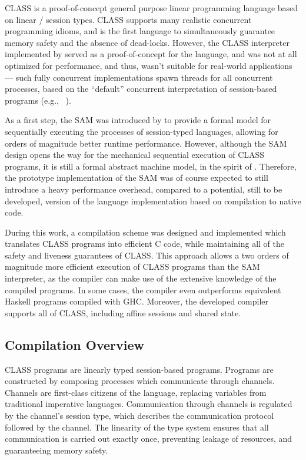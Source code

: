 \documentclass[sigconf,nonacm,natbib=true]{acmart}
\begin{document}
\acs{CLASS} \citep{Rocha:2021, Rocha:2023, Rocha:2022} is a proof-of-concept general purpose linear programming language based on linear / session types.
\acs{CLASS} supports many realistic concurrent programming idioms, and is the first language to simultaneously guarantee memory safety and the absence of dead-locks.
%
However, the \acs{CLASS} interpreter implemented by \citet{Rocha:2021:artifact,Rocha:2023:artifact} served as a proof-of-concept for the language, and was not at all optimized for performance, and thus, wasn't suitable for real-world applications --- such fully concurrent implementations spawn threads for all concurrent processes, based on the ``default'' concurrent interpretation of session-based programs (e.g., ~\citep{FreeST:2019,Jespersen:2015}).
%

%
As a first step, the \acf{SAM}  was introduced by \citet{Caires:2024} to provide a formal model for sequentially executing the processes of session-typed languages, allowing for orders of magnitude better runtime performance.
However, although the \ac{SAM} design opens the way for the mechanical sequential execution of CLASS programs, it is still a formal abstract machine model, in the spirit of \citep{Landin:1964,Lafont:1988}. Therefore, the prototype implementation of the SAM \citep{Caires:2024:artifact} was of course expected to still introduce a heavy performance overhead, compared to a potential, still to be developed, version of the language implementation based on compilation to native code.

During this work, a compilation scheme was designed and implemented which translates \acs{CLASS} programs into efficient C code, while maintaining all of the safety and liveness guarantees of \acs{CLASS}. This approach allows a two orders of magnitude more efficient execution of \acs{CLASS} programs than the \ac{SAM} interpreter, as the compiler can make use of the extensive knowledge of the compiled programs. In some cases, the compiler even outperforms equivalent Haskell programs compiled with GHC. Moreover, the developed compiler supports all of \acs{CLASS}, including affine sessions and shared state.

\subsection{Compilation Overview}

\ac{CLASS} programs are linearly typed session-based programs. Programs are constructed by composing processes which communicate through channels. Channels are first-class citizens of the language, replacing variables from traditional imperative languages. Communication through channels is regulated by the channel's session type, which describes the communication protocol followed by the channel. The linearity of the type system ensures that all communication is carried out exactly once, preventing leakage of resources, and guaranteeing memory safety.
\end{document}
